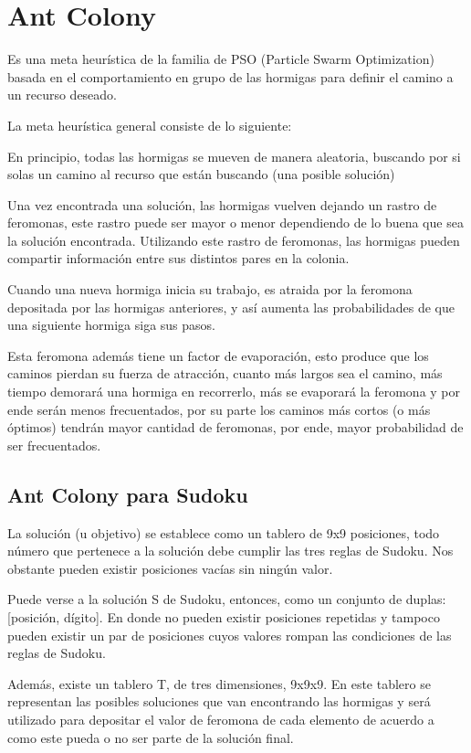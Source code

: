 \documentclass[a4paper,spanish]{article}
\begin{document}
\clearpage


\section{Ant Colony}

Es una meta heurística de la familia de PSO (Particle Swarm Optimization) basada en el comportamiento en grupo 
de las hormigas para definir el camino a un recurso deseado.

La meta heurística general consiste de lo siguiente:

En principio, todas las hormigas se mueven de manera aleatoria, buscando por si solas un camino 
al recurso que están buscando (una posible solución)

Una vez encontrada una solución, las hormigas vuelven dejando un rastro de feromonas, 
este rastro puede ser mayor o menor dependiendo de lo buena que sea la solución encontrada.
Utilizando este rastro de feromonas, las hormigas pueden compartir información entre sus distintos 
pares en la colonia. 

Cuando una nueva hormiga inicia su trabajo, es atraida por la feromona depositada por las hormigas 
anteriores, y así aumenta las probabilidades de que una siguiente hormiga siga sus pasos.

Esta feromona además tiene un factor de evaporación, esto produce que los caminos pierdan su 
fuerza de atracción, cuanto más largos sea el camino, más tiempo demorará una hormiga en recorrerlo, 
más se evaporará la feromona y por ende serán menos frecuentados, por su parte los caminos más cortos 
(o más óptimos) tendrán mayor cantidad de feromonas, por ende, mayor probabilidad de ser frecuentados.

\subsection{Ant Colony para Sudoku}

La solución (u objetivo) se establece como un tablero de 9x9 posiciones, todo número que pertenece a la 
solución debe cumplir las tres reglas de Sudoku. Nos obstante pueden existir posiciones vacías sin ningún valor.

Puede verse a la solución S de Sudoku, entonces, como un conjunto de duplas: [posición, dígito]. En donde no pueden
existir posiciones repetidas y tampoco pueden existir un par de posiciones cuyos valores rompan las condiciones de 
las reglas de Sudoku.

Además, existe un tablero T, de tres dimensiones, 9x9x9. En este tablero se representan las posibles soluciones
que van encontrando las hormigas y será utilizado para depositar el valor de feromona de cada elemento de acuerdo
a como este pueda o no ser parte de la solución final.
\end{document}
